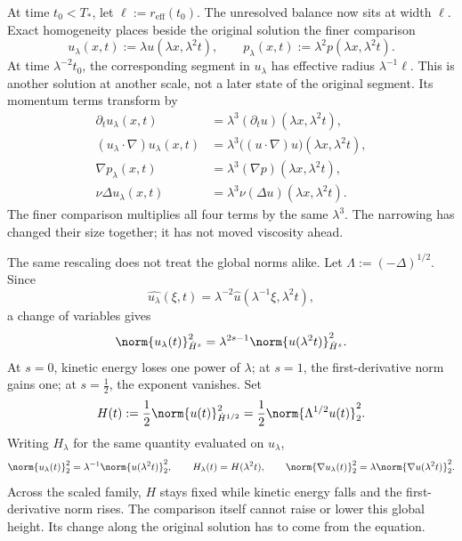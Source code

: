
At time \(t_0<T_*\), let \(\ell:=r_{\mathrm{eff}}(t_0)\). The unresolved balance now sits at width \(\ell\). Exact \NavierStokes{} homogeneity places beside the original solution the finer comparison
\[
  u_\lambda(x,t)
  :=
  \lambda u(\lambda x,\lambda^2t),
  \qquad
  p_\lambda(x,t)
  :=
  \lambda^2p(\lambda x,\lambda^2t).
\]
At time \(\lambda^{-2}t_0\), the corresponding segment in \(u_\lambda\) has effective radius \(\lambda^{-1}\ell\). This is another solution at another scale, not a later state of the original segment. Its momentum terms transform by
\[
\begin{aligned}
  \partial_tu_\lambda(x,t)
  &=
  \lambda^3(\partial_tu)(\lambda x,\lambda^2t),
  \\
  (u_\lambda\cdot\nabla)u_\lambda(x,t)
  &=
  \lambda^3\bigl((u\cdot\nabla)u\bigr)(\lambda x,\lambda^2t),
  \\
  \nabla p_\lambda(x,t)
  &=
  \lambda^3(\nabla p)(\lambda x,\lambda^2t),
  \\
  \nu\Delta u_\lambda(x,t)
  &=
  \lambda^3\nu(\Delta u)(\lambda x,\lambda^2t).
\end{aligned}
\]
The finer comparison multiplies all four terms by the same \(\lambda^3\). The narrowing has changed their size together; it has not moved viscosity ahead.


The same rescaling does not treat the global norms alike. Let \(\Lambda:=(-\Delta)^{1/2}\). Since
\[
  \widehat{u_\lambda}(\xi,t)
  =
  \lambda^{-2}\widehat u(\lambda^{-1}\xi,\lambda^2t),
\]
a change of variables gives
\[
  \norm{u_\lambda(t)}_{\dot H^s}^2
  =
  \lambda^{2s-1}
  \norm{u(\lambda^2t)}_{\dot H^s}^2.
\]
At \(s=0\), kinetic energy loses one power of \(\lambda\); at \(s=1\), the first-derivative norm gains one; at \(s=\tfrac12\), the exponent vanishes. Set
\[
  H(t)
  :=
  \frac12\norm{u(t)}_{\dot H^{1/2}}^2
  =
  \frac12\norm{\Lambda^{1/2}u(t)}_2^2.
\]
Writing \(H_\lambda\) for the same quantity evaluated on \(u_\lambda\),
\[
  \norm{u_\lambda(t)}_2^2
  =
  \lambda^{-1}\norm{u(\lambda^2t)}_2^2,
  \qquad
  H_\lambda(t)=H(\lambda^2t),
  \qquad
  \norm{\nabla u_\lambda(t)}_2^2
  =
  \lambda\norm{\nabla u(\lambda^2t)}_2^2.
\]
Across the scaled family, \(H\) stays fixed while kinetic energy falls and the first-derivative norm rises. The comparison itself cannot raise or lower this global height. Its change along the original solution has to come from the equation.

